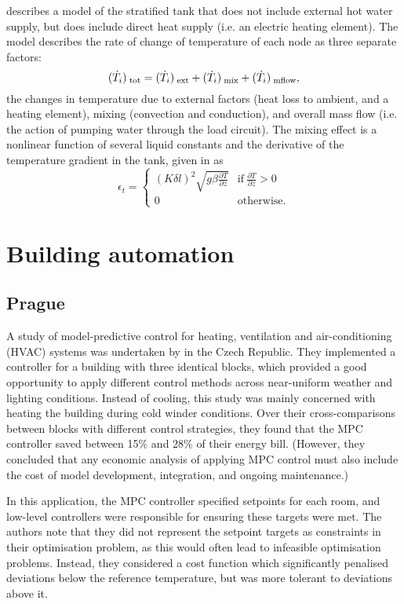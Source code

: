 \textcite{Pfeiffer11} describes a model of the stratified tank that does not include external hot water supply, but does include direct heat supply (i.e. an electric heating element).
The model describes the rate of change of temperature of each node as three separate factors:
$$ (\dot{T}_{i})_{\;\text{tot}} = (\dot{T}_{i})_{\;\text{ext}} + (\dot{T}_{i})_{\;\text{mix}} + (\dot{T}_{i})_{\;\text{mflow}}, $$
the changes in temperature due to external factors (heat loss to ambient, and a heating element), mixing (convection and conduction), and overall mass flow (i.e. the action of pumping water through the load circuit).
The mixing effect is a nonlinear function of several liquid constants and the derivative of the temperature gradient in the tank, given in \textcite{Hawlader88} as
$$ \epsilon_t = \left\{ \begin{array}{ll}
   (K \delta l)^2 \sqrt{g \beta \frac{\partial T}{\partial z}} & \text{if}\ \frac{\partial T}{\partial z} > 0 \\
   0 & \text{otherwise}.
\end{array} \right. $$

\section{Building automation}

\subsection{Prague}

A study of model-predictive control for heating, ventilation and
air-conditioning (HVAC) systems was undertaken by \textcite{Siroky11} in the Czech Republic.
They implemented a controller for a building with three identical blocks, which provided a good opportunity to apply different control methods across near-uniform weather and lighting conditions.
Instead of cooling, this study was mainly concerned with heating the building during cold winder conditions.
Over their cross-comparisons between blocks with different control strategies, they found that the MPC controller saved between 15\% and 28\% of their energy bill.
(However, they concluded that any economic analysis of applying MPC control must also include the cost of model development, integration, and ongoing maintenance.)

In this application, the MPC controller specified setpoints for each room, and low-level controllers were responsible for ensuring these targets were met.
The authors note that they did not represent the setpoint targets as constraints in their optimisation problem, as this would often lead to infeasible optimisation problems.
Instead, they considered a cost function which significantly penalised deviations below the reference temperature, but was more tolerant to deviations above it.

